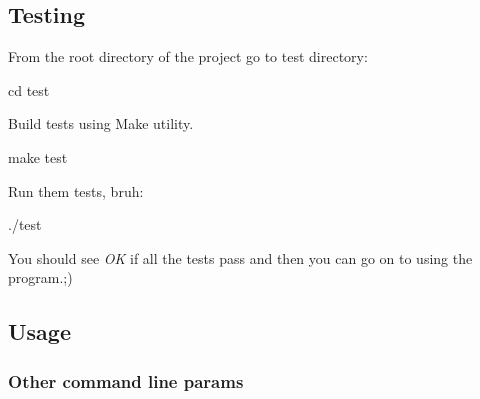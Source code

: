 \subsection*{Testing}


\begin{DoxyEnumerate}
\item From the root directory of the project go to test directory\+:

{\ttfamily cd test}
\item Build tests using Make utility.

{\ttfamily make test}
\item Run them tests, bruh\+:

{\ttfamily ./test}
\end{DoxyEnumerate}

You should see {\itshape OK} if all the tests pass and then you can go on to using the program.;)

\subsection*{\label{_use}%
Usage}

\subsubsection*{Other command line params}